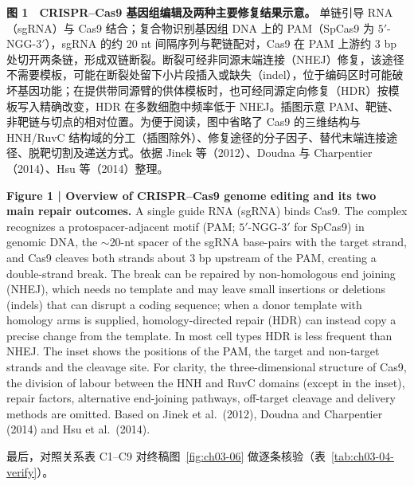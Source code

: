 \begin{BookNote}
\textbf{图 1　CRISPR–Cas9 基因组编辑及两种主要修复结果示意。} 单链引导 RNA（sgRNA）与 Cas9 结合；复合物识别基因组 DNA 上的 PAM（SpCas9 为 $5'$-NGG-$3'$），sgRNA 的约 20 nt 间隔序列与靶链配对，Cas9 在 PAM 上游约 3 bp 处切开两条链，形成双链断裂。断裂可经非同源末端连接（NHEJ）修复，该途径不需要模板，可能在断裂处留下小片段插入或缺失（indel），位于编码区时可能破坏基因功能；在提供带同源臂的供体模板时，也可经同源定向修复（HDR）按模板写入精确改变，HDR 在多数细胞中频率低于 NHEJ。插图示意 PAM、靶链、非靶链与切点的相对位置。为便于阅读，图中省略了 Cas9 的三维结构与 HNH/RuvC 结构域的分工（插图除外）、修复途径的分子因子、替代末端连接途径、脱靶切割及递送方式。依据 Jinek 等（2012）、Doudna 与 Charpentier（2014）、Hsu 等（2014）整理。

\medskip
\textbf{Figure 1 | Overview of CRISPR–Cas9 genome editing and its two main repair outcomes.} A single guide RNA (sgRNA) binds Cas9. The complex recognizes a protospacer-adjacent motif (PAM; $5'$-NGG-$3'$ for SpCas9) in genomic DNA, the $\sim$20-nt spacer of the sgRNA base-pairs with the target strand, and Cas9 cleaves both strands about 3 bp upstream of the PAM, creating a double-strand break. The break can be repaired by non-homologous end joining (NHEJ), which needs no template and may leave small insertions or deletions (indels) that can disrupt a coding sequence; when a donor template with homology arms is supplied, homology-directed repair (HDR) can instead copy a precise change from the template. In most cell types HDR is less frequent than NHEJ. The inset shows the positions of the PAM, the target and non-target strands and the cleavage site. For clarity, the three-dimensional structure of Cas9, the division of labour between the HNH and RuvC domains (except in the inset), repair factors, alternative end-joining pathways, off-target cleavage and delivery methods are omitted. Based on Jinek et al.\ (2012), Doudna and Charpentier (2014) and Hsu et al.\ (2014).
\end{BookNote}

最后，对照关系表 C1–C9 对终稿图~\ref{fig:ch03-06} 做逐条核验（表~\ref{tab:ch03-04-verify}）。

